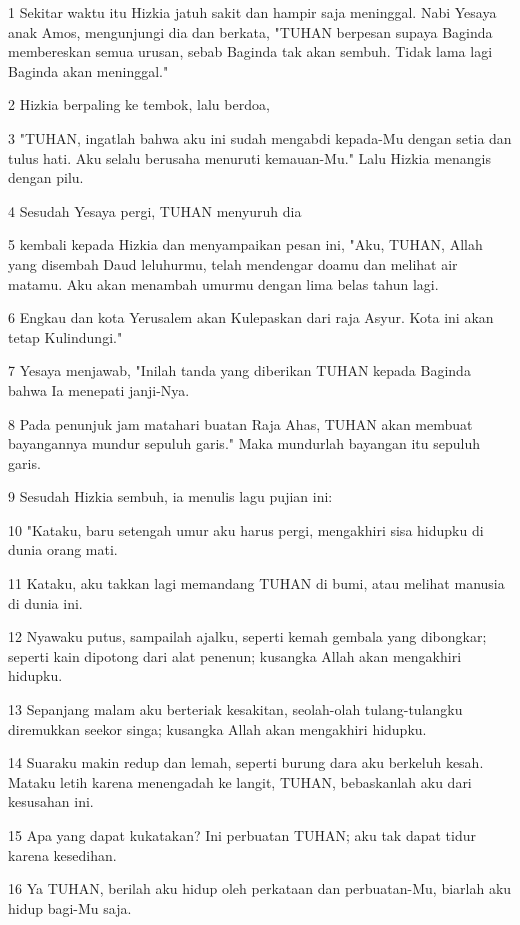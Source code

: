 \par 1 Sekitar waktu itu Hizkia jatuh sakit dan hampir saja meninggal. Nabi Yesaya anak Amos, mengunjungi dia dan berkata, "TUHAN berpesan supaya Baginda membereskan semua urusan, sebab Baginda tak akan sembuh. Tidak lama lagi Baginda akan meninggal."
\par 2 Hizkia berpaling ke tembok, lalu berdoa,
\par 3 "TUHAN, ingatlah bahwa aku ini sudah mengabdi kepada-Mu dengan setia dan tulus hati. Aku selalu berusaha menuruti kemauan-Mu." Lalu Hizkia menangis dengan pilu.
\par 4 Sesudah Yesaya pergi, TUHAN menyuruh dia
\par 5 kembali kepada Hizkia dan menyampaikan pesan ini, "Aku, TUHAN, Allah yang disembah Daud leluhurmu, telah mendengar doamu dan melihat air matamu. Aku akan menambah umurmu dengan lima belas tahun lagi.
\par 6 Engkau dan kota Yerusalem akan Kulepaskan dari raja Asyur. Kota ini akan tetap Kulindungi."
\par 7 Yesaya menjawab, "Inilah tanda yang diberikan TUHAN kepada Baginda bahwa Ia menepati janji-Nya.
\par 8 Pada penunjuk jam matahari buatan Raja Ahas, TUHAN akan membuat bayangannya mundur sepuluh garis." Maka mundurlah bayangan itu sepuluh garis.
\par 9 Sesudah Hizkia sembuh, ia menulis lagu pujian ini:
\par 10 "Kataku, baru setengah umur aku harus pergi, mengakhiri sisa hidupku di dunia orang mati.
\par 11 Kataku, aku takkan lagi memandang TUHAN di bumi, atau melihat manusia di dunia ini.
\par 12 Nyawaku putus, sampailah ajalku, seperti kemah gembala yang dibongkar; seperti kain dipotong dari alat penenun; kusangka Allah akan mengakhiri hidupku.
\par 13 Sepanjang malam aku berteriak kesakitan, seolah-olah tulang-tulangku diremukkan seekor singa; kusangka Allah akan mengakhiri hidupku.
\par 14 Suaraku makin redup dan lemah, seperti burung dara aku berkeluh kesah. Mataku letih karena menengadah ke langit, TUHAN, bebaskanlah aku dari kesusahan ini.
\par 15 Apa yang dapat kukatakan? Ini perbuatan TUHAN; aku tak dapat tidur karena kesedihan.
\par 16 Ya TUHAN, berilah aku hidup oleh perkataan dan perbuatan-Mu, biarlah aku hidup bagi-Mu saja.
